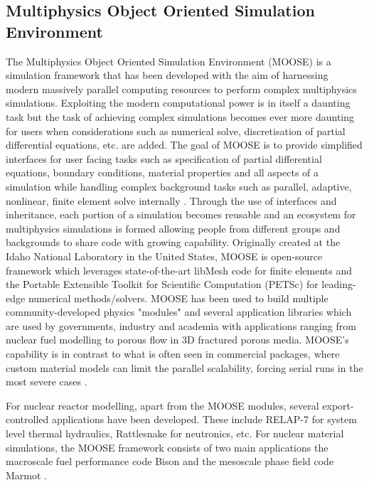 \subsection{Multiphysics Object Oriented Simulation Environment}
	The Multiphysics Object Oriented Simulation Environment (MOOSE) is a simulation framework that has been developed with the aim of harnessing modern massively parallel computing resources to perform complex multiphysics simulations. Exploiting the modern computational power is in itself a daunting task but the task of achieving complex simulations becomes ever more daunting for users when considerations such as numerical solve, discretisation of partial differential equations, etc. are added. The goal of MOOSE is to provide simplified interfaces for user facing tasks such as specification of partial differential equations, boundary conditions, material properties and all aspects of a simulation while handling complex background tasks such as parallel, adaptive, nonlinear, finite element solve internally \cite{Permann:2020aa}. Through the use of interfaces and inheritance, each portion of a simulation becomes reusable and an ecosystem for multiphysics simulations is formed allowing people from different groups and backgrounds to share code with growing capability. Originally created at the Idaho National Laboratory in the United States, MOOSE is open-source framework which leverages state-of-the-art libMesh code \cite{Kirk:2006aa} for finite elements and the Portable Extensible Toolkit for Scientific Computation (PETSc) \cite{Balay:2022ab,Balay:2022aa} for leading-edge numerical methods/solvers. MOOSE has been used to build multiple community-developed physics "modules" \cite{Guillaume:2021aa,Guillaume:2021ab,Adhikary:2016aa,Wilkins:2020aa,Shemon:2021aa} and several application libraries which are used by governments, industry and academia with applications ranging from nuclear fuel modelling to porous flow in 3D fractured porous media. MOOSE's capability is in contrast to what is often seen in commercial packages, where custom material models can limit the parallel scalability, forcing serial runs in the most severe cases \cite{gaston2015physics}. 
	
	For nuclear reactor modelling, apart from the MOOSE modules, several export-controlled applications have been developed. These include {RELAP-7} \cite{Zhang:aa} for system level thermal hydraulics, {Rattlesnake} \cite{Wang:aa} for neutronics, etc. For nuclear material simulations, the {MOOSE} framework consists of two main applications the macroscale fuel performance code {Bison} \cite{WILLIAMSON2012149} and the mesoscale phase field code {Marmot}  \cite{Tonks12}. 
	
